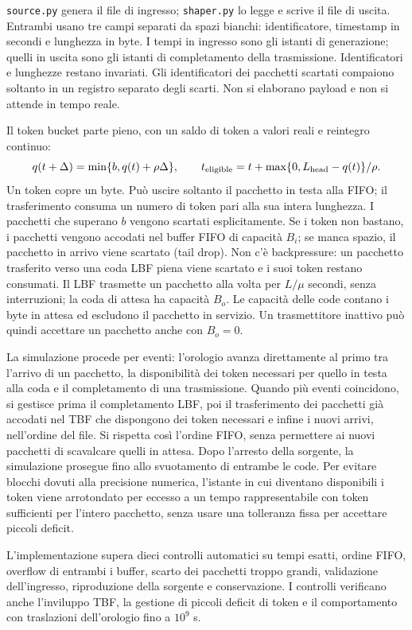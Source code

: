 \documentclass[10pt,a4paper]{article}
\begin{document}
\texttt{source.py} genera il file di ingresso; \texttt{shaper.py} lo legge e scrive
il file di uscita. Entrambi usano tre campi separati da spazi bianchi: identificatore,
timestamp in secondi e lunghezza in byte. I tempi in ingresso sono gli istanti di
generazione; quelli in uscita sono gli istanti di completamento della trasmissione.
Identificatori e lunghezze restano invariati. Gli identificatori dei pacchetti scartati
compaiono soltanto in un registro separato degli scarti. Non si elaborano payload
e non si attende in tempo reale.

Il token bucket parte pieno, con un saldo di token a valori reali e reintegro continuo:
\[
q(t+\Delta)=\min\{b,q(t)+\rho\Delta\},\qquad
t_{\rm eligible}=t+\max\{0,L_{\rm head}-q(t)\}/\rho.
\]
Un token copre un byte. Può uscire soltanto il pacchetto in testa alla FIFO; il
trasferimento consuma un numero di token pari alla sua intera lunghezza. I pacchetti
che superano $b$ vengono scartati esplicitamente. Se i token non bastano, i pacchetti
vengono accodati nel buffer FIFO di capacità $B_i$; se manca spazio, il pacchetto
in arrivo viene scartato (tail drop). Non c'è backpressure: un pacchetto trasferito
verso una coda LBF piena viene scartato e i suoi token restano consumati. Il LBF
trasmette un pacchetto alla volta per $L/\mu$ secondi, senza interruzioni; la coda
di attesa ha capacità $B_o$. Le capacità delle code contano i byte in attesa ed
escludono il pacchetto in servizio. Un trasmettitore inattivo può quindi accettare
un pacchetto anche con $B_o=0$.

La simulazione procede per eventi: l'orologio avanza direttamente al primo tra
l'arrivo di un pacchetto, la disponibilità dei token necessari per quello in testa
alla coda e il completamento di una trasmissione. Quando più eventi coincidono,
si gestisce prima il completamento LBF, poi il trasferimento dei pacchetti già
accodati nel TBF che dispongono dei token necessari e infine i nuovi arrivi,
nell'ordine del file. Si rispetta così l'ordine FIFO, senza permettere ai nuovi
pacchetti di scavalcare quelli in attesa. Dopo l'arresto della sorgente, la
simulazione prosegue fino allo svuotamento di entrambe le code. Per evitare blocchi
dovuti alla precisione numerica, l'istante in cui diventano disponibili i token
viene arrotondato per eccesso a un tempo rappresentabile con token sufficienti
per l'intero pacchetto, senza usare una tolleranza fissa per accettare piccoli deficit.

L'implementazione supera dieci controlli automatici su tempi esatti, ordine FIFO,
overflow di entrambi i buffer, scarto dei pacchetti troppo grandi, validazione
dell'ingresso, riproduzione della sorgente e conservazione. I controlli verificano
anche l'inviluppo TBF, la gestione di piccoli deficit di token e il comportamento
con traslazioni dell'orologio fino a $10^9$ s.
\clearpage
\end{document}
